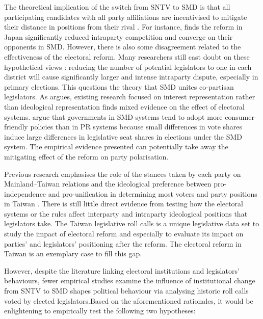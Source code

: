 The theoretical implication of the switch from SNTV to SMD is that all participating candidates with all party affiliations are incentivised to mitigate their distance in positions from their rival \citep{Downs1957, Duverger1954,Catalinac2016}. For instance, \citet{Catalinac2016} finds the reform in Japan significantly reduced intraparty competition and converge on their opponents in SMD. However, there is also some disagreement related to the effectiveness of the electoral reform. Many researchers still cast doubt on these hypothetical views \citep[e.g.,][]{Wu2003, Hirano2006}: reducing the number of potential legislators to one in each district will cause significantly larger and intense intraparty dispute, especially in primary elections. This questions the theory that SMD unites co-partisan legislators. As \citet{Rickard2018} argues, existing research focused on interest representation rather than ideological representation finds mixed evidence on the effect of electoral systems. \citet{Chang2010} argue that governments in SMD systems tend to adopt more consumer-friendly policies than in PR systems because small differences in vote shares induce large differences in legislative seat shares in elections under the SMD system. The empirical evidence presented can potentially take away the mitigating effect of the reform on party polarisation. 

Previous research emphasises the role of the stances taken by each party on Mainland–Taiwan relations and the ideological preference between pro-independence and pro-unification in determining most voters and party positions in Taiwan \citep[][]{Clark2012, Hsiao2012,Huang2005, Hsiao2012}. There is still little direct evidence from testing how the electoral systems or the rules affect interparty and intraparty ideological positions that legislators take. The Taiwan legislative roll calls is a unique legislative data set to study the impact of electoral reform and especially to evaluate its impact on parties' and legislators' positioning after the reform. The electoral reform in Taiwan is an exemplary case to fill this gap. 

However, despite the literature linking electoral institutions and legislators' behaviours, fewer empirical studies examine the influence of institutional change from SNTV to SMD shapes political behaviour via analysing historic roll calls voted by elected legislators.Based on the aforementioned rationales, it would be enlightening to empirically test the following two  hypotheses:

